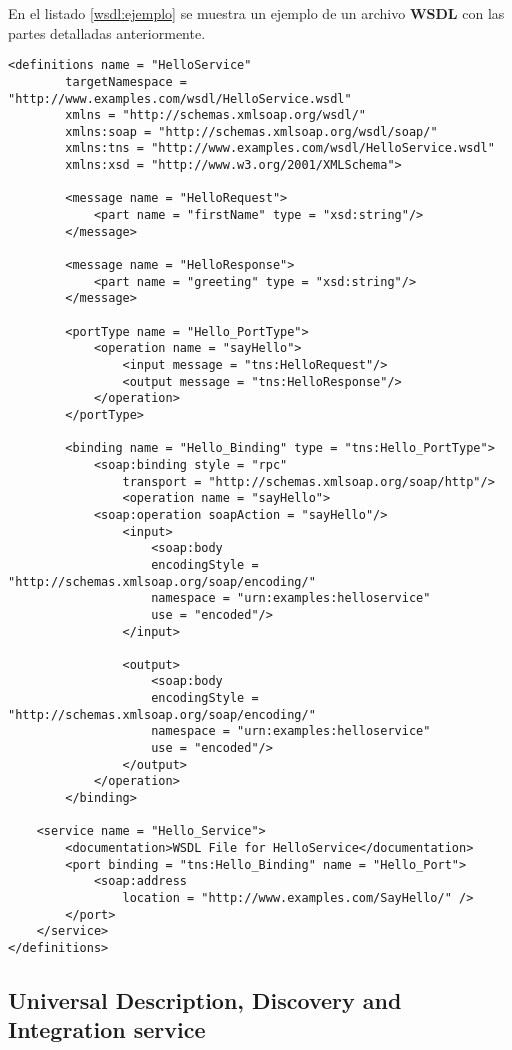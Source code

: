 En el listado \ref{wsdl:ejemplo} se muestra un ejemplo de un archivo \textbf{WSDL} con las partes detalladas anteriormente.

 \begin{lstlisting}[label=wsdl:ejemplo, caption= Ejemplo de un mensaje WSDL. Tomado de \cite{W3C2022}]
	<definitions name = "HelloService"
		targetNamespace = "http://www.examples.com/wsdl/HelloService.wsdl"
		xmlns = "http://schemas.xmlsoap.org/wsdl/"
		xmlns:soap = "http://schemas.xmlsoap.org/wsdl/soap/"
		xmlns:tns = "http://www.examples.com/wsdl/HelloService.wsdl"
		xmlns:xsd = "http://www.w3.org/2001/XMLSchema">

		<message name = "HelloRequest">
			<part name = "firstName" type = "xsd:string"/>
		</message>

		<message name = "HelloResponse">
			<part name = "greeting" type = "xsd:string"/>
		</message>

		<portType name = "Hello_PortType">
			<operation name = "sayHello">
				<input message = "tns:HelloRequest"/>
				<output message = "tns:HelloResponse"/>
			</operation>
		</portType>

		<binding name = "Hello_Binding" type = "tns:Hello_PortType">
			<soap:binding style = "rpc"
				transport = "http://schemas.xmlsoap.org/soap/http"/>
				<operation name = "sayHello">
			<soap:operation soapAction = "sayHello"/>
				<input>
					<soap:body
					encodingStyle = "http://schemas.xmlsoap.org/soap/encoding/"
					namespace = "urn:examples:helloservice"
					use = "encoded"/>
				</input>
	
				<output>
					<soap:body
					encodingStyle = "http://schemas.xmlsoap.org/soap/encoding/"
					namespace = "urn:examples:helloservice"
					use = "encoded"/>
				</output>
	    	</operation>
		</binding>

	<service name = "Hello_Service">
		<documentation>WSDL File for HelloService</documentation>
		<port binding = "tns:Hello_Binding" name = "Hello_Port">
			<soap:address
				location = "http://www.examples.com/SayHello/" />
		</port>
	</service>
</definitions>
 \end{lstlisting}
  



 	\subsection{Universal Description, Discovery and Integration service } 
   
